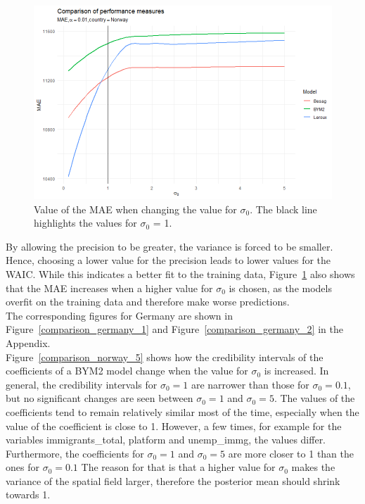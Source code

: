 %     
\begin{figure}[H]
    \centering
    \includegraphics[width = \textwidth]{mae_norway_smooth.png}
    \caption{Value of the MAE when changing the value for $\sigma_0$. The black line highlights the values for $\sigma_0$ = 1.}
    \label{comparison_norway_2}
\end{figure}
%     
By allowing the precision to be greater, the variance is forced to be smaller. Hence, choosing a lower value for the precision leads to lower values for the WAIC. While this indicates a better fit to the training data, Figure~\ref{comparison_norway_2} also shows that the MAE increases when a higher value for $\sigma_0$ is chosen, as the models overfit on the training data and therefore make worse predictions. \\
The corresponding figures for Germany are shown in Figure~\ref{comparison_germany_1} and Figure~\ref{comparison_germany_2} in the Appendix. \\
Figure~\ref{comparison_norway_5} shows how the credibility intervals of the coefficients of a BYM2 model change when the value for $\sigma_0$ is increased. In general, the credibility intervals for $\sigma_0 = 1$ are narrower than those for $\sigma_0 = 0.1$, but no significant changes are seen between $\sigma_0 = 1$ and $\sigma_0 = 5$. The values of the coefficients tend to remain relatively similar most of the time, especially when the value of the coefficient is close to 1. However, a few times, for example for the variables immigrants\_total, platform and unemp\_immg, the values differ. Furthermore, the coefficients for $\sigma_0 = 1$ and $\sigma_0 = 5$ are more closer to 1 than the ones for $\sigma_0=0.1$ The reason for that is that a higher value for $\sigma_0$ makes the variance of the spatial field larger, therefore the posterior mean should shrink towards 1.
